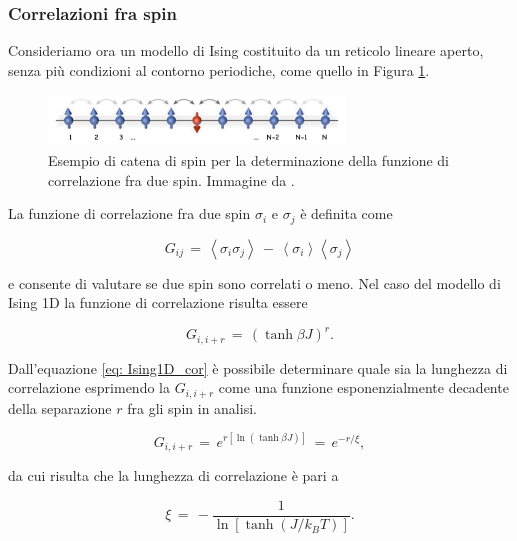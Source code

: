 \subsubsection{Correlazioni fra spin}

Consideriamo ora un modello di Ising costituito da un reticolo lineare aperto, senza più condizioni al contorno periodiche, 
come quello in Figura \ref{fig: Ising1D_open}. 

\begin{figure}[H]
    \centering
    \includegraphics[width=0.7\textwidth]{Immagini/Ising1D_open.png}
    \caption{Esempio di catena di spin per la determinazione della funzione di correlazione fra due spin. Immagine da \cite{galliFSA}.}
    \label{fig: Ising1D_open}
\end{figure}

La funzione di correlazione fra due spin $\sigma_i$ e $\sigma_j$ è definita come

\begin{equation}
    G_{ij}\,=\,\left<\sigma_i \sigma_j\right>\,-\,\left<\sigma_i\right>\left<\sigma_j\right>
    \label{eq: def_corr_fun_Ising1D}
\end{equation}

e consente di valutare se due spin sono correlati o meno. Nel caso del modello di Ising 1D la funzione di correlazione 
risulta essere

\begin{equation}
    G_{i, i+r}\,=\,\left(\tanh{\beta J}\right)^r.
    \label{eq: Ising1D_cor}
\end{equation}

Dall'equazione \eqref{eq: Ising1D_cor} è possibile determinare quale sia la lunghezza di correlazione esprimendo la 
$G_{i, i+r}$ come una funzione esponenzialmente decadente della separazione $r$ fra gli spin in analisi. 

\begin{equation}
    G_{i, i+r}\,=\,e^{r\left[\ln{\left(\tanh{\beta J}\right)}\right]}\,=\,e^{-r/\xi},
    \label{eq: Ising1D_corr_exp}
\end{equation}

da cui risulta che la lunghezza di correlazione è pari a 

\begin{equation}
    \xi\,=\,-\frac{1}{\ln{\left[\tanh{\left(J/k_B T\right)}\right]}}.
    \label{eq: lungh_corr}
\end{equation}

